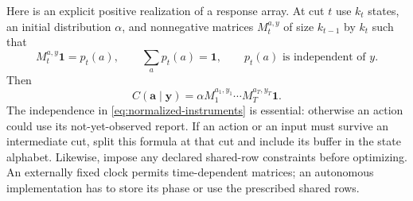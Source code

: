 Here is an explicit positive realization of a response array. At cut
$t$ use $k_t$ states, an initial distribution $\alpha$, and nonnegative
matrices $M_t^{a,y}$ of size $k_{t-1}$ by $k_t$ such that
\begin{equation}\label{eq:normalized-instruments}
 M_t^{a,y}\mathbf1=p_t(a),\qquad
 \sum_a p_t(a)=\mathbf1,\qquad
 p_t(a)\text{ is independent of }y.
\end{equation}
Then
\begin{equation}\label{eq:positive-realization}
 C(\mathbf a\mid\mathbf y)
   =\alpha M_1^{a_1,y_1}\cdots M_T^{a_T,y_T}\mathbf1.
\end{equation}
The independence in \eqref{eq:normalized-instruments} is essential:
otherwise an action could use its not-yet-observed report. If an action
or an input must survive an intermediate cut, split this formula at that
cut and include its buffer in the state alphabet. Likewise, impose any
declared shared-row constraints before optimizing. An externally fixed
clock permits time-dependent matrices; an autonomous implementation has
to store its phase or use the prescribed shared rows.

